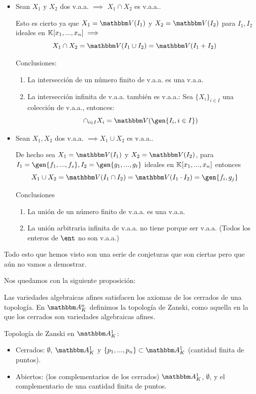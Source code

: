 \begin{itemize}
	\item Sean $X_1$ y $X_2$ dos v.a.a. $\implies$ $X_1 \cap X_2$ es v.a.a..

	Esto es cierto ya que $X_1=\V(I_1)$ y $X_2=\V(I_2)$ para $I_1,I_2$ ideales en $\mathbb{K}[x_1,...,x_n] \implies$
	$$X_1 \cap X_2 = \V(I_1 \cup I_2)=\V(I_1+I_2)$$


	Conclusiones:
	\begin{enumerate}
		\item La intersección de un número finito de v.a.a. es una v.a.a.
		\item La intersección infinita de v.a.a. también es v.a.a.: Sea $\{ X_i \}_{i\in I}$ una colección de v.a.a., entonces:
		\[ \cap_{i\in I}X_i = \V(\gen{I_i, i \in I}) \]
	\end{enumerate}
	\item Sean $X_1, X_2$ dos v.a.a. $\implies X_1 \cup X_2$ es v.a.a..

	De hecho sea  $X_1=\V(I_1)$ y $X_2=\V(I_2)$,  para $I_1=\gen{f_1,...,f_s},I_2=\gen{g_1,...,g_t}$ ideales en $\mathbb{K}[x_1,...,x_n]$ entonces
	$$X_1 \cup X_2=\V(I_1 \cap I_2)=\V(I_1 \cdot I_2)=\gen{f_i, g_j}$$

	Conclusiones
	\begin{enumerate}
		\item La unión de un número finito de v.a.a. es una v.a.a.
		\item La unión arbitraria infinita de v.a.a. no tiene porque ser v.a.a. (Todos los enteros de $\ent$ no son v.a.a.)
	\end{enumerate}
\end{itemize}

Todo esto que hemos visto son una serie de conjeturas que son ciertas pero que aún no vamos a demostrar.

Nos quedamos con la siguiente proposición:

\begin{prop}
	Las variedades algebraicas afines satisfacen los axiomas de los cerrados de una topología. En $\Akn$ definimos la topología de Zanski, como aquella en la que los cerrados son variedades algebraicas afines.
\end{prop}

\begin{example}
	Topología de Zanski en $\A^1_K$:
	\begin{itemize}
		\item Cerrados: $\emptyset$, $\A^1_K$ y $\{ p_1,...,p_n \} \subset \A^1_K$ (cantidad finita de puntos).
		\item Abiertos: (los complementarios de los cerrados) $\A^1_K$, $\emptyset$, y el complementario de una cantidad finita de puntos.
	\end{itemize}
\end{example}



